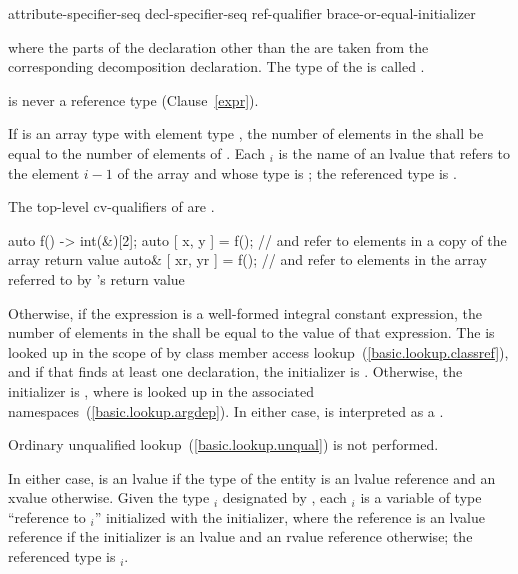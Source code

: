 \begin{ncbnf}
attribute-specifier-seq\opt{} decl-specifier-seq ref-qualifier\opt{}  brace-or-equal-initializer \terminal{;}
\end{ncbnf}

where the parts of the declaration other than the  are taken
from the corresponding decomposition declaration. The type of the 
 is called .
\begin{note}
 is never a reference type (Clause~\ref{expr}).
\end{note}

\pnum
If  is an array type with element type , the number
of elements in the  shall be equal to the
number of elements of . Each $_i$ is the name of an
lvalue that refers to the element $i - 1$ of the array and whose type
is ; the referenced type is .
\begin{note}
The top-level cv-qualifiers of  are \cv.
\end{note}
\begin{example}
\begin{codeblock}
  auto f() -> int(&)[2];
  auto [ x, y ] = f();     //  and  refer to elements in a copy of the array return value
  auto& [ xr, yr ] = f();  //  and  refer to elements in the array referred to by 's return value
\end{codeblock}
\end{example}

\pnum
Otherwise, if the expression  is a
well-formed integral constant expression, the number of elements in
the  shall be equal to the value of that
expression. The   is looked up
in the scope of  by class member access lookup~(\ref{basic.lookup.classref}),
and if that finds at least one declaration, the initializer is
. Otherwise, the initializer is ,
where  is looked up in the associated namespaces~(\ref{basic.lookup.argdep}).
In either case,  is interpreted as a .
\begin{note}
Ordinary unqualified lookup~(\ref{basic.lookup.unqual}) is not performed.
\end{note}
In either case,  is an lvalue if the type of the entity 
is an lvalue reference and an xvalue otherwise. Given the type $_i$
designated by , each $_i$
is a variable of type ``reference to $_i$'' initialized with the
initializer, where the reference is an lvalue reference if the initializer is
an lvalue and an rvalue reference otherwise; the referenced type is $_i$.

